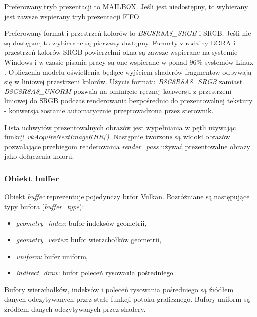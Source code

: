 Preferowany tryb prezentacji to MAILBOX. Jeśli jest niedostępny, to wybierany jest zawsze wspierany tryb prezentacji FIFO.

Preferowany format i przestrzeń kolorów to \textit{B8G8R8A8\_SRGB} i SRGB. Jeśli nie są dostępne, to wybierane są pierwszy dostępny.
Formaty z rodziny BGRA i przestrzeń kolorów SRGB powierzchni okna są zawsze wspierane na systemie Windows i w czasie pisania pracy są one wspierane w ponad $96\%$ systemów Linux \cite{GPUINFO}.
Obliczenia modelu oświetlenia będące wyjściem shaderów fragmentów odbywają się w liniowej przestrzeni kolorów. Użycie formatu \textit{B8G8R8A8\_SRGB} zamiast \textit{B8G8R8A8\_UNORM} pozwala na ominięcie ręcznej konwersji z przestrzeni liniowej do SRGB podczas renderowania bezpośrednio do prezentowalnej tekstury - konwersja zostanie automatycznie przeprowadzona przez sterownik.

Lista uchwytów prezentowalnych obrazów jest wypełniania w pętli używając funkcji \textit{vkAcquireNextImageKHR()}.
Następnie tworzone są widoki obrazów pozwalające przebiegom renderowania \textit{render\_pass} używać prezentowalne obrazy jako dołączenia koloru.


\subsubsection{Obiekt buffer}
Obiekt \textit{buffer} reprezentuje pojedynczy bufor Vulkan.
Rozróżniane są następujące typy bufora (\textit{buffer\_type}):
\begin{itemize}
	\item \textit{geometry\_index}: bufor indeksów geometrii,
	\item \textit{geometry\_vertex}: bufor wierzchołków geometrii,
	\item \textit{uniform}: bufer uniform,
	\item \textit{indirect\_draw}: bufor poleceń rysowania pośredniego.
\end{itemize}
Bufory wierzchołków, indeksów i poleceń rysowania pośredniego są źródłem danych odczytywanych przez stałe funkcji potoku graficznego.
Bufory uniform są źródłem danych odczytywanych przez shadery.

